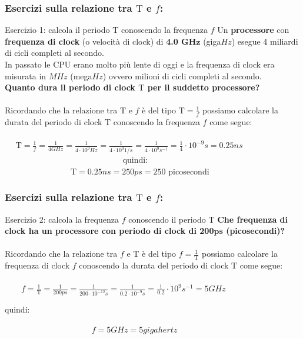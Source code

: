 \begin{frame}
	\frametitle{Esercizi sulla relazione tra $\mathrm{T}$ e $f$:}
	
	\begin{block}{Esercizio 1: calcola il periodo $\mathrm{T}$ conoscendo la frequenza $f$}
		Un \textbf{processore} con \textbf{frequenza di clock} (o velocità di clock) di \textbf{4.0 $\pmb{GHz}$} (giga$Hz$) esegue 4 miliardi di cicli completi al secondo.\\
		In passato le CPU erano molto più lente di oggi e la frequenza di clock era misurata in $MHz$ (mega$Hz$) ovvero milioni di cicli completi al secondo.\\
		\textbf{Quanto dura il periodo di clock $\pmb{\mathrm{T}}$ per il suddetto processore?}\\~\\
		\pause
		Ricordando che la relazione tra $\mathrm{T}$ e $f$ è del tipo $\mathrm{T} = \frac{1}{f}$ possiamo calcolare la durata del periodo di clock $\mathrm{T}$ conoscendo la frequenza $f$ come segue:\\~\\
		\pause
		$\quad\,\, \mathrm{T} = \frac{1}{f} = \frac{1}{4 GHz} = \frac{1}{4 \cdot 10^9 Hz} = \frac{1}{4 \cdot 10^9 1/s} = \frac{1}{4 \cdot 10^9 s^{-1}} = \frac{1}{4} \cdot 10^{-9} s = 0.25ns$\\ \vspace{0.4em}
		\pause
		$\qquad\qquad\qquad\qquad\qquad\qquad\qquad$	quindi:\\ \vspace{0.4em}
		$\qquad\qquad\qquad\qquad \mathrm{T} = 0.25ns = 250 ps = 250$ picosecondi
	\end{block}
	
\end{frame}


\begin{frame}
	\frametitle{Esercizi sulla relazione tra $\mathrm{T}$ e $f$:}
	
	\begin{block}{Esercizio 2: calcola la frequenza $f$ conoscendo il periodo $\mathrm{T}$}
		\textbf{Che frequenza di clock ha un processore con periodo di clock di 200$\pmb{ps}$ (picosecondi)?}\\~\\
		\pause
		Ricordando che la relazione tra $f$ e $\mathrm{T}$ è del tipo $f = \frac{1}{\mathrm{T}}$ possiamo calcolare la frequenza di clock $f$ conoscendo la durata del periodo di clock $\mathrm{T}$ come segue:\\~\\
		\pause
		$\qquad f = \frac{1}{\mathrm{T}} = \frac{1}{200 ps} = \frac{1}{200 \cdot 10^{-12} s} = \frac{1}{0.2 \cdot 10^{-9} s} = \frac{1}{0.2} \cdot \dot 10^9 s^{-1} = 5 GHz$
		\pause
		\begin{center}
			quindi:
		\end{center}
		$\qquad\qquad\qquad\qquad\qquad\;\; f = 5 GHz = 5 gigahertz$
	\end{block}
	
\end{frame}


